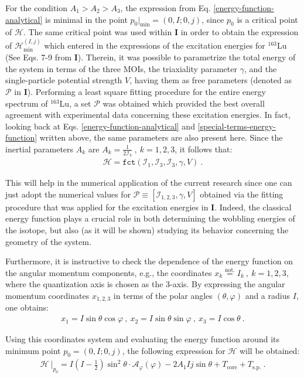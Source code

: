 \documentclass[myclassdoc,debug]{rjparticle}
\begin{document}
For the condition $A_1>A_2>A_3$, the expression from Eq. \ref{energy-function-analytical} is minimal in the point $p_0|_\text{min}=(0,I;0,j)$, since $p_0$ is a critical point of $\mathcal{H}$. The same critical point was used within \textbf{I} in order to obtain the expression of $\mathcal{H}_\text{min}^{(I,j)}$ which entered in the expressions of the excitation energies for $^{163}$Lu (See Eqs. 7-9 from \textbf{I}). Therein, it was possible to parametrize the total energy of the system in terms of the three MOIs, the triaxiality parameter $\gamma$, and the single-particle potential strength $V$, having them as free parameters (denoted as $\mathcal{P}$ in \textbf{I}). Performing a least square fitting procedure for the entire energy spectrum of $^{163}$Lu, a set $\mathcal{P}$ was obtained which provided the best overall agreement with experimental data concerning these excitation energies. In fact, looking back at Eqs. \ref{energy-function-analytical} and \ref{special-terms-energy-function} written above, the same parameters are also present here. Since the inertial parameters $A_k$ are $A_k=\frac{1}{2\mathcal{I}_k}\ ,\ k=1,2,3$, it follows that:
\begin{align}
    \mathcal{H}=\texttt{fct}(\mathcal{I}_1,\mathcal{I}_3,\mathcal{I}_3,\gamma,V)\ .
\end{align}

This will help in the numerical application of the current research since one can just adopt the numerical values for $\mathcal{P}\equiv\left[\mathcal{I}_{1,2,3},\gamma,V\right]$ obtained via the fitting procedure that was applied for the excitation energies in \textbf{I}. Indeed, the classical energy function plays a crucial role in both determining the wobbling energies of the isotope, but also (as it will be shown) studying its behavior concerning the geometry of the system. 

Furthermore, it is instructive to check the dependence of the energy function on the angular momentum components, e.g., the coordinates $x_k\overset{\mathrm{not.}}{=}I_k\ ,\ k=1,2,3$, where the quantization axis is chosen as the 3-axis. By expressing the angular momentum coordinates $x_{1,2,3}$ in terms of the polar angles $(\theta,\varphi)$ and a radius $I$, one obtains: 
\begin{align}
    x_1=I\sin\theta\cos\varphi\ ,\ x_2=I\sin\theta\sin\varphi\ ,\ x_3=I\cos\theta\ .
    \label{coordinate-parametrization}
\end{align}

Using this coordinates system and evaluating the energy function around its minimum point $p_0=(0,I;0,j)$, the following expression for $\mathcal{H}$ will be obtained:
\begin{align}
    \left. \mathcal{H}\ \right\vert_{p_0}=I\left(I-\frac{1}{2}\right)\sin^2\theta\cdot\mathcal{A}_\varphi(\varphi)-2A_1Ij\sin\theta+T_\text{core}+T_\text{s.p.}\ .
    \label{energy-function-minimal}
\end{align}
\end{document}
